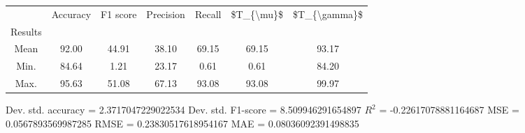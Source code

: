 \begin{tabular}{|c|c|c|c|c|c|c|}
\toprule
{} &  Accuracy &  F1 score &  Precision &  Recall &  \$T\_\{\textbackslash mu\}\$ &  \$T\_\{\textbackslash gamma\}\$ \\
Results &           &           &            &         &            &               \\
\hline
Mean    &     92.00 &     44.91 &      38.10 &   69.15 &      69.15 &         93.17 \\
Min.    &     84.64 &      1.21 &      23.17 &    0.61 &       0.61 &         84.20 \\
Max.    &     95.63 &     51.08 &      67.13 &   93.08 &      93.08 &         99.97 \\
\bottomrule
\end{tabular}

 Dev. std. accuracy = 2.3717047229022534
 Dev. std. F1-score = 8.509946291654897
 $R^2$ = -0.22617078881164687
 MSE = 0.0567893569987285
 RMSE = 0.23830517618954167
 MAE = 0.08036092391498835